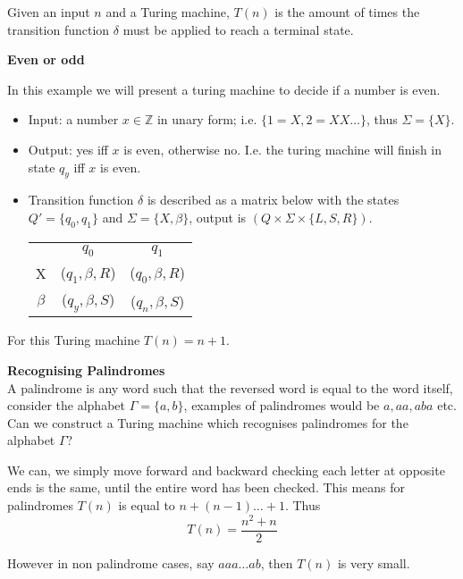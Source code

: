 \begin{definition}
    Given an input $n$ and a Turing machine,
    $T(n)$ is the amount of times the transition function 
    $\delta$ must be applied to reach a terminal state.
\end{definition}

\textbf{Even or odd}
\begin{example}
    In this example we will present a turing machine to decide if a number is even.
    \begin{itemize}
        \item Input: a number $x \in \mathbb{Z}$ in unary form; i.e. $\{1 = X, 2 = XX\dots\}$,
            thus $\Sigma = \{X\}$.
        \item Output: yes iff $x$ is even, otherwise no. I.e. the turing machine will finish
            in state $q_y$ iff $x$ is even.
        \item Transition function $\delta$ is described as a matrix below with the states
            $Q\prime = \{q_0,q_1\}$ and $\Sigma = \{X,\beta\}$,
            output is $(Q \times \Sigma \times \{L,S,R\})$.
            \begin{center}
                \begin{tabular}{ c c c }
                    & $q_0$           & $q_1$           \\
                    X    & ($q_1,\beta,R$) & ($q_0,\beta,R$) \\
                    $\beta$ & ($q_y,\beta,S$) & ($q_n,\beta,S$) \\
                \end{tabular}
            \end{center}
    \end{itemize}
    For this Turing machine $T(n) = n + 1$.
\end{example}

\textbf{Recognising Palindromes}\\
A palindrome is any word such that the reversed word is equal to the word itself,
consider the alphabet $\Gamma = \{a,b\}$, examples of palindromes would be $a, aa, aba$ etc.
Can we construct a Turing machine which recognises palindromes for the alphabet $\Gamma$?

We can, we simply move forward and backward checking each letter at opposite ends is the same,
until the entire word has been checked.
This means for palindromes $T(n)$ is equal to $n + (n - 1) \dots + 1$. Thus
$$T(n) = \frac{n^2 + n}{2}$$

However in non palindrome cases, say $aaa \dots ab$, then $T(n)$ is very small.

